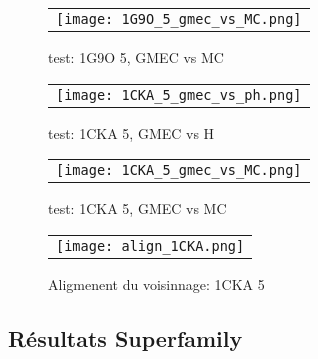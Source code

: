     
    \begin{figure}[h]
      \centering
      \begin{tabular}{c} 
        \texttt{[image: 1G9O\_5\_gmec\_vs\_MC.png]} 
      \end{tabular}
      
      \caption{test: 1G9O 5, GMEC vs MC}
\label{image:1G9O_5_GMEC_vs_MC}
    \end{figure}
    
    \begin{figure}[h]
      \centering
      \begin{tabular}{c} 
        \texttt{[image: 1CKA\_5\_gmec\_vs\_ph.png]} 
      \end{tabular}
      
      \caption{test: 1CKA 5, GMEC vs H}
\label{image:1CKA_5_GMEC_vs_H}
    \end{figure}

    \begin{figure}[h]
      \centering
      \begin{tabular}{c} 
        \texttt{[image: 1CKA\_5\_gmec\_vs\_MC.png]} 
      \end{tabular}
      
      \caption{test: 1CKA 5, GMEC vs MC}
\label{image:1CKA_5_GMEC_vs_MC}
    \end{figure}
    
    \clearpage


    \begin{figure}[h]
      \centering
      \begin{tabular}{c} 
        \texttt{[image: align\_1CKA.png]} 
      \end{tabular}
      
      \caption{Aligmenent du voisinnage: 1CKA 5}
\label{image:Align_Suboptimal}
    \end{figure}




   \subsection{Résultats Superfamily}


